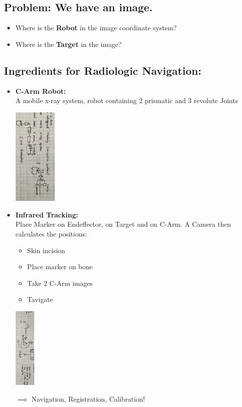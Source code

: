 \documentclass{exerciseBlue}
\begin{document}
  \subsection{Problem: We have an image.}
  \begin{itemize}
  	\item  Where is the \textbf{Robot} in the image coordinate system?
  	\item Where is the \textbf{Target} in the image?
  \end{itemize}  
\newpage
\subsection{Ingredients for Radiologic Navigation:}
\begin{itemize}
	\item \textbf{C-Arm Robot:}\\
	A mobile x-ray system, robot containing 2 prismatic and 3 revolute Joints
	\begin{center}
		\includegraphics[height = 4.8cm]{Images/C-ARM}
	\end{center}
	\item \textbf{Infrared Tracking:}\\
	Place Marker on Endeffector, on Target and on C-Arm. A Camera then calculates the positions:
	\begin{itemize}
		\item Skin incision
		\item Place marker on bone
		\item Take 2 C-Arm images
		\item Tavigate
	\end{itemize}
	\begin{center}
		\includegraphics[height = 4cm]{Images/Stereo1}
	\end{center}
	\item[$\implies$] Navigation, Registration, Calibration!
\end{itemize}
\newpage
\end{document}
